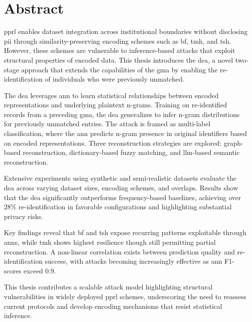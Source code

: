 

\chapter{Abstract}

\ac{pprl} enables dataset integration across institutional boundaries without disclosing \ac{pii} through similarity-preserving encoding schemes such as \ac{bf}, \ac{tmh}, and \ac{tsh}.
However, these schemes are vulnerable to inference-based attacks that exploit structural properties of encoded data.
This thesis introduces the \ac{dea}, a novel two-stage approach that extends the capabilities of the \ac{gma} by enabling the re-identification of individuals who were previously unmatched.

The \ac{dea} leverages \ac{ann} to learn statistical relationships between encoded representations and underlying plaintext n-grams.
Training on re-identified records from a preceding \ac{gma}, the \ac{dea} generalizes to infer n-gram distributions for previously unmatched entries.
The attack is framed as multi-label classification, where the \ac{ann} predicts n-gram presence in original identifiers based on encoded representations.
Three reconstruction strategies are explored: graph-based reconstruction, dictionary-based fuzzy matching, and \ac{llm}-based semantic reconstruction.

Extensive experiments using synthetic and semi-realistic datasets evaluate the \ac{dea} across varying dataset sizes, encoding schemes, and overlaps.
Results show that the \ac{dea} significantly outperforms frequency-based baselines, achieving over 28\% re-identification in favorable configurations and highlighting substantial privacy risks.

Key findings reveal that \ac{bf} and \ac{tsh} expose recurring patterns exploitable through \ac{ann}s, while \ac{tmh} shows highest resilience though still permitting partial reconstruction.
A non-linear correlation exists between prediction quality and re-identification success, with attacks becoming increasingly effective as \ac{ann} F1-scores exceed 0.9.

This thesis contributes a scalable attack model highlighting structural vulnerabilities in widely deployed \ac{pprl} schemes, underscoring the need to reassess current protocols and develop encoding mechanisms that resist statistical inference.
